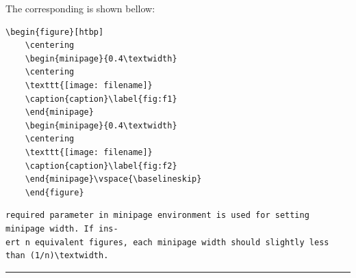 The corresponding is shown bellow:
\begin{lstlisting}[language={[LaTeX]TeX}]
	\begin{figure}[htbp]
	\centering
	\begin{minipage}{0.4\textwidth}
	\centering
	\texttt{[image: filename]}
	\caption{caption}\label{fig:f1}
	\end{minipage}
	\begin{minipage}{0.4\textwidth}
	\centering
	\texttt{[image: filename]}
	\caption{caption}\label{fig:f2}
	\end{minipage}\vspace{\baselineskip}
	\end{figure}
\end{lstlisting}

\begin{lstlisting}[language={[LaTeX]TeX}]
required parameter in minipage environment is used for setting minipage width. If ins-
ert n equivalent figures, each minipage width should slightly less than (1/n)\textwidth.
\end{lstlisting}

\noindent\hrule

